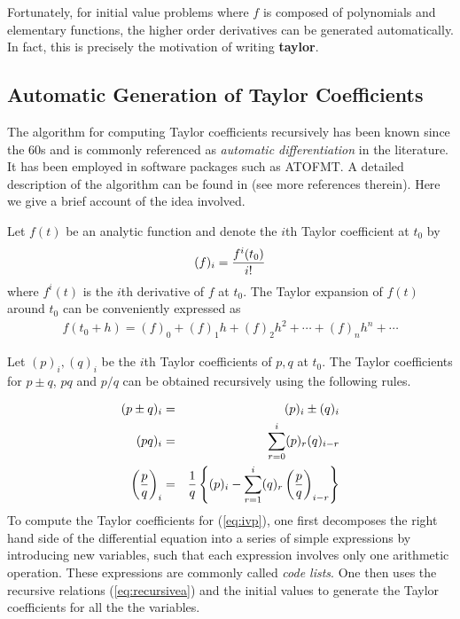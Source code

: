 \documentclass[10pt]{article}
\theoremstyle{remark}
\newcommand{\taylorname}{{\bf taylor}}
\begin{document}
Fortunately, for initial value problems where $f$ is composed of
polynomials and elementary functions, the higher order derivatives can
be generated automatically. In fact, this is precisely the motivation
of writing \taylorname{}.

\subsection*{Automatic Generation of Taylor Coefficients}

The algorithm for computing Taylor coefficients recursively has been
known since the 60s and is commonly referenced as {\it automatic
  differentiation} in the literature. It has been employed in software
packages such as ATOFMT.  A detailed description of the algorithm can
be found in \cite{JZ} (see more references therein).  Here we give a
brief account of the idea involved.


Let $f(t)$ be an analytic function and denote the $i$th Taylor
coefficient at $t_0$ by
\begin{eqnarray*}
(f)_i = {{f^{i}(t_0)} \over {i!}}
\end{eqnarray*}
where $f^{i}(t)$ is the $i$th derivative of $f$ at $t_0$. 
The Taylor expansion of $f(t)$ around $t_0$ can be
conveniently expressed as
\begin{eqnarray*}
f(t_0 +h) = (f)_0 + (f)_1 h + (f)_2 h^2 + \cdots + (f)_n h^n + \cdots
\end{eqnarray*}

Let $(p)_i, (q)_i$ be the $i$th Taylor coefficients of $p, q$ at
$t_0$. The Taylor coefficients for $p\pm q$, $pq$ and $p/q$ can be
obtained recursively using the following rules.

\begin{eqnarray}
\label{eq:recursivea}
(p\pm q)_i &=& (p)_i \pm (q)_i \cr
(p q)_i &=& \sum_{r=0}^{i} (p)_r (q)_{i-r} \cr
\left({p\over q}\right)_i &=& {1\over q}\left\{ 
(p)_i - \sum_{r=1}^{i} (q)_r \left({p\over q}\right)_{i-r}\right\} 
\end{eqnarray}
To compute the Taylor coefficients for (\ref{eq:ivp}), one first
decomposes the right hand side of the differential equation into a
series of simple expressions by introducing new variables, such that
each expression involves only one arithmetic operation. These
expressions are commonly called {\it code lists}. One then uses the
recursive relations (\ref{eq:recursivea}) and the initial values to
generate the Taylor coefficients for all the the variables.
\end{document}
